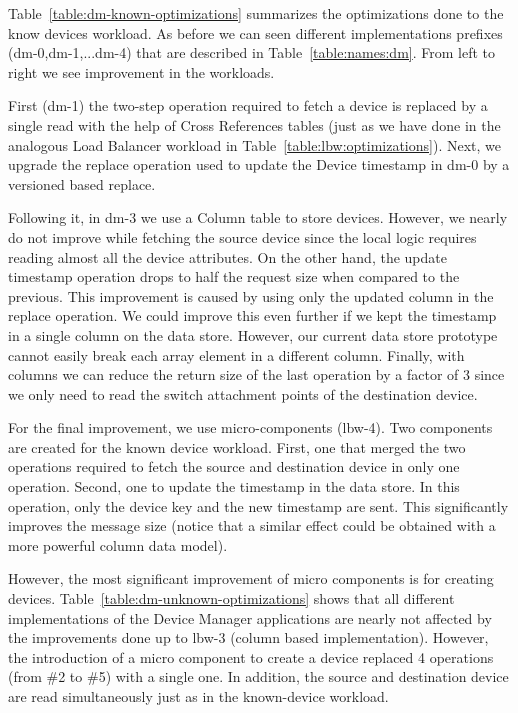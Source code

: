 Table~\ref{table:dm-known-optimizations} summarizes the optimizations done to the know  devices workload. 
As before we can seen different implementations prefixes (dm-0,dm-1,...dm-4) that are described in Table~\ref{table:names:dm}. 
From left to right we see improvement in the workloads. 

First  (dm-1) the two-step operation required to fetch a device is replaced by a single read  with the help of Cross References tables (just as we have done in the analogous Load Balancer workload in Table~\ref{table:lbw:optimizations}). 
Next, we upgrade  the replace operation used to update the Device timestamp in dm-0 by a versioned based replace. 

Following it, in dm-3 we use a Column table to store devices.  
However,  we nearly do not improve  while fetching the source device since the local logic requires reading almost all the device attributes. 
On the other hand, the update timestamp operation drops to half the request size when compared to the previous.  
This improvement is caused by using only the updated column in the replace operation. 
We could improve this even further if we kept the timestamp in a single column on the data store. 
However, our current data store prototype cannot easily break each array element in a different column. 
Finally,  with columns we can reduce the return size of the last operation by a factor of 3 since we only need to read the switch attachment points of the destination device. 

For the final improvement, we use micro-components (lbw-4).  Two components are created for the known device workload. 
First, one that merged the two operations required to fetch the source and destination device in only one operation.
Second, one to update the timestamp in the data store.  In this operation,  only the device key and the new timestamp are sent. This  significantly improves the message size (notice that a similar effect could be obtained with a more powerful column data model).  

However,  the most significant improvement of micro components is for creating devices. Table~\ref{table:dm-unknown-optimizations} shows that all different implementations of the Device Manager applications are nearly not affected by the improvements  done up to lbw-3 (column based implementation). However, the introduction of a micro component to create a device replaced  4 operations (from \#2 to \#5) with a single one.  In addition, the source and destination device are read simultaneously just as in the known-device workload. 

